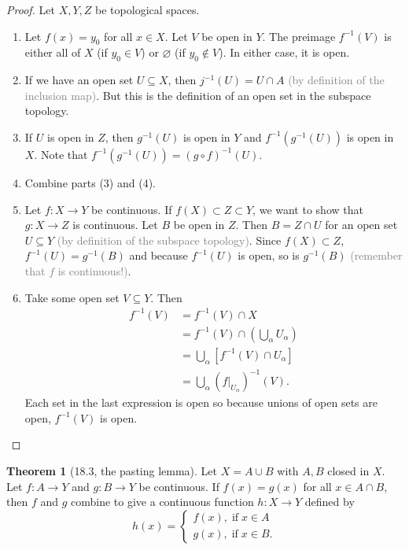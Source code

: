 \documentclass{article}
\newcommand{\com}[1]{\textcolor{grey}{#1}}
\theoremstyle{definition}
\newtheorem{theorem}{Theorem}[subsection]
\begin{document}
\begin{flushleft}
\begin{proof}
Let $X, Y, Z$ be topological spaces.
\begin{enumerate}
    \item Let $f(x) = y_0$ for all $x \in X$. Let $V$ be open in $Y$. The preimage $f^{-1}(V)$ is either all of $X$ (if $y_0 \in V$) or $\varnothing$ (if $y_0 \notin V$). In either case, it is open.
    \item If we have an open set $U \subseteq X$, then $j^{-1}(U) = U \cap A$ \com{(by definition of the inclusion map)}. But this is the definition of an open set in the subspace topology.
    \item If $U$ is open in $Z$, then $g^{-1}(U)$ is open in $Y$ and $f^{-1}(g^{-1}(U))$ is open in $X$. Note that $f^{-1}(g^{-1}(U)) = (g \circ f)^{-1}(U)$.
    \item Combine parts (3) and (4).
    \item Let $f: X \to Y$ be continuous. If $f(X) \subset Z \subset Y$, we want to show that $g : X \to Z$ is continuous. Let $B$ be open in $Z$. Then $B = Z \cap U$ for an open set $U \subseteq Y$ \com{(by definition of the subspace topology)}. Since $f(X) \subset Z$, $f^{-1}(U) = g^{-1}(B)$ and because $f^{-1}(U)$ is open, so is $g^{-1}(B)$ \com{(remember that $f$ is continuous!)}.
    \item Take some open set $V \subseteq Y$. Then
    \[
    \begin{align}
        f^{-1}(V) &= f^{-1}(V) \cap X \\
        &= f^{-1}(V) \cap (\bigcup_{\alpha} U_\alpha ) \\
        &= \bigcup_\alpha \left[f^{-1}(V) \cap U_\alpha \right] \\
        &= \bigcup_\alpha (f|_{U_\alpha})^{-1}(V).
    \end{align}
    \]
    Each set in the last expression is open so because unions of open sets are open, $f^{-1}(V)$ is open.
\end{enumerate}
\end{proof}

\begin{theorem}[18.3, the pasting lemma]
Let $X = A \cup B$ with $A,B$ closed in $X$. Let $f: A \to Y$ and $g: B \to Y$ be continuous. If $f(x) = g(x)$ for all $x \in A \cap B$, then $f$ and $g$ combine to give a continuous function $h: X \to Y$ defined by
\[
h(x) = \begin{cases}
f(x), \; \text{if} \; x \in A \\
g(x), \; \text{if} \; x \in B.
\end{cases}
\]
\end{theorem}


\end{flushleft}
\end{document}
